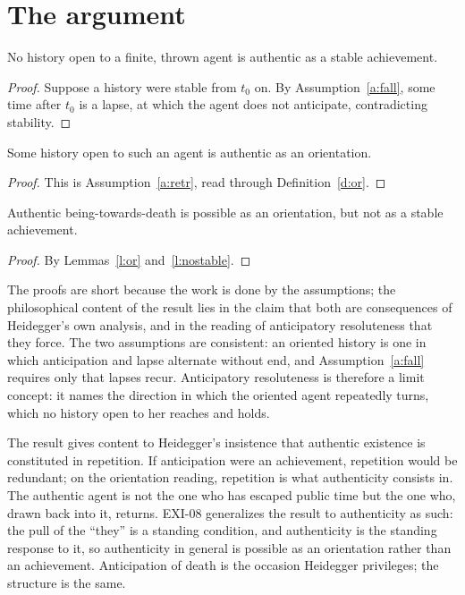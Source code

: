 \documentclass{situationist-preprint}
\begin{document}
\section{The argument}\label{s:arg}

\begin{lemma}\label{l:nostable}
No history open to a finite, thrown agent is authentic as a stable achievement.
\end{lemma}

\begin{proof}
Suppose a history were stable from $t_0$ on. By Assumption~\ref{a:fall}, some time after $t_0$ is a lapse, at which the agent does not anticipate, contradicting stability.
\end{proof}

\begin{lemma}\label{l:or}
Some history open to such an agent is authentic as an orientation.
\end{lemma}

\begin{proof}
This is Assumption~\ref{a:retr}, read through Definition~\ref{d:or}.
\end{proof}

\begin{theorem}\label{t:main}
Authentic being-towards-death is possible as an orientation, but not as a stable achievement.
\end{theorem}

\begin{proof}
By Lemmas~\ref{l:or} and~\ref{l:nostable}.
\end{proof}

The proofs are short because the work is done by the assumptions; the philosophical content of the result lies in the claim that both are consequences of Heidegger's own analysis, and in the reading of anticipatory resoluteness that they force. The two assumptions are consistent: an oriented history is one in which anticipation and lapse alternate without end, and Assumption~\ref{a:fall} requires only that lapses recur. Anticipatory resoluteness is therefore a limit concept: it names the direction in which the oriented agent repeatedly turns, which no history open to her reaches and holds.

\begin{remark}\label{r:repetition}
The result gives content to Heidegger's insistence that authentic existence is constituted in repetition. If anticipation were an achievement, repetition would be redundant; on the orientation reading, repetition is what authenticity consists in. The authentic agent is not the one who has escaped public time but the one who, drawn back into it, returns. EXI-08 generalizes the result to authenticity as such: the pull of the \enquote{they} is a standing condition, and authenticity is the standing response to it, so authenticity in general is possible as an orientation rather than an achievement. Anticipation of death is the occasion Heidegger privileges; the structure is the same.
\end{remark}
\end{document}
